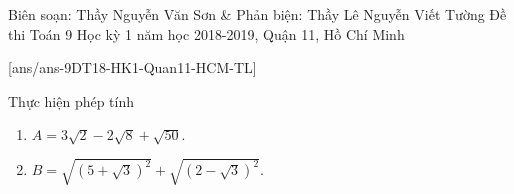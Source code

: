 \begin{name}
{Biên soạn: Thầy Nguyễn Văn Sơn \& Phản biện: Thầy Lê Nguyễn Viết Tường}
{Đề thi Toán 9 Học kỳ 1 năm học 2018-2019, Quận 11, Hồ Chí Minh}
\end{name}
\setcounter{bt}{0}
[ans/ans-9DT18-HK1-Quan11-HCM-TL]
\begin{bt}%
Thực hiện phép tính
\begin{enumerate}
\item $A=3\sqrt{2}-2\sqrt{8}+\sqrt{50}.$
\item $B=\sqrt{\left(5+\sqrt{3} \right)^2}+\sqrt{\left(2-\sqrt{3} \right)^2}.$
\end{enumerate}
\end{bt}
